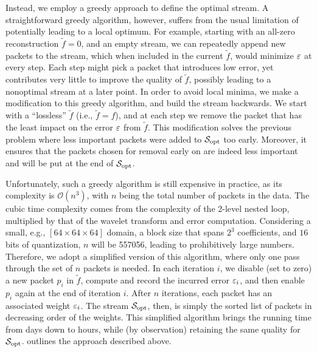 Instead, we employ a greedy approach to define the optimal stream.  A straightforward greedy
algorithm, however, suffers from the usual limitation of potentially leading to a local optimum. For
example, starting with an all-zero reconstruction $\tilde{f}=0$, and an empty stream, we can
repeatedly append new packets to the stream, which when included in the current $\tilde{f}$, would
minimize $\err$ at every step. Each step might pick a packet that introduces low error, yet
contributes very little to improve the quality of $\tilde{f}$, possibly leading to a nonoptimal
stream at a later point. In order to avoid local minima, we make a modification to this greedy
algorithm, and build the stream backwards. We start with a ``lossless'' $\tilde{f}$ (i.e.,
$\tilde{f}=f$), and at each step we remove the packet that has the least impact on the error $\err$
from $\tilde{f}$. This modification solves the previous problem where less important packets were
added to $\sopt$ too early. Moreover, it ensures that the packets chosen for removal early on are
indeed less important and will be put at the end of $\sopt$.

Unfortunately, such a greedy algorithm is still expensive in practice, as its complexity is
$\mathcal{O}(n^3)$, with $n$ being the total number of packets in the data. The cubic time
complexity comes from the complexity of the 2-level nested loop, multiplied by that of the wavelet
transform and error computation. Considering a small, e.g., $[64 \times 64 \times 64]$ domain, a
block size that spans $2^3$ coefficients, and $16$ bits of quantization, $n$ will be 557056, leading
to prohibitively large numbers. Therefore, we adopt a simplified version of this algorithm, where
only one pass through the set of $n$ packets is needed. In each iteration $i$, we disable (set to
zero) a new packet $p_i$ in $\tilde{f}$, compute and record the incurred error $\err_i$, and then
enable $p_i$ again at the end of iteration $i$. After $n$ iterations, each packet has an associated
weight $\err_i$. The stream $\sopt$, then, is simply the sorted list of packets in decreasing order
of the weights. This simplified algorithm brings the running time from days down to hours, while (by
observation) retaining the same quality for $\sopt$.  outlines the approach
described above.

